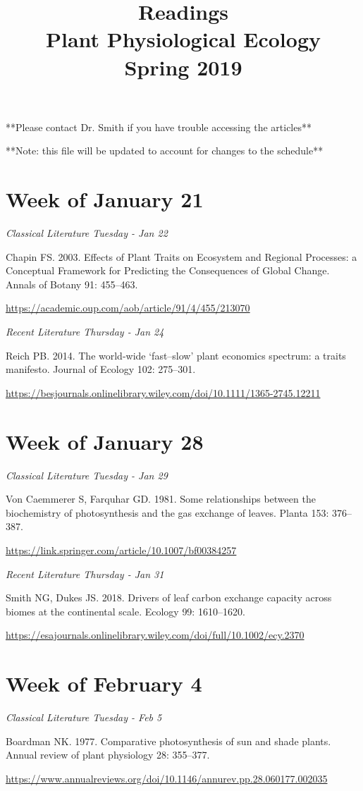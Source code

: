 \documentclass[12pt, notitlepage]{article}   	%
\title{
	\textbf{
		Readings
	} \\
	\large Plant Physiological Ecology \\
	\large Spring 2019
}
\date{\vspace{-5ex}}
\begin{document}
{\selectfont %

\maketitle

**Please contact Dr. Smith if you have trouble accessing the articles**

**Note: this file will be updated to account for changes to the schedule**

\section*{Week of January 21}
\textit{Classical Literature Tuesday - Jan 22} \par
Chapin FS. 2003. Effects of Plant Traits on Ecosystem and Regional Processes: 
a Conceptual Framework for Predicting the Consequences of Global Change. 
Annals of Botany 91: 455–463. \par
\url{https://academic.oup.com/aob/article/91/4/455/213070}

\textit{Recent Literature Thursday - Jan 24} \par
Reich PB. 2014. The world-wide ‘fast–slow’ plant economics spectrum: a traits manifesto. 
Journal of Ecology 102: 275–301. \par
\url{https://besjournals.onlinelibrary.wiley.com/doi/10.1111/1365-2745.12211}

\section*{Week of January 28}
\textit{Classical Literature Tuesday - Jan 29} \par
Von Caemmerer S, Farquhar GD. 1981. Some relationships between the biochemistry of 
photosynthesis and the gas exchange of leaves. Planta 153: 376–387. \par
\url{https://link.springer.com/article/10.1007/bf00384257}

\textit{Recent Literature Thursday - Jan 31} \par
Smith NG, Dukes JS. 2018. Drivers of leaf carbon exchange capacity across biomes at 
the continental scale. Ecology 99: 1610–1620. \par
\url{https://esajournals.onlinelibrary.wiley.com/doi/full/10.1002/ecy.2370}

\section*{Week of February 4}
\textit{Classical Literature Tuesday - Feb 5} \par
Boardman NK. 1977. Comparative photosynthesis of sun and shade plants. 
Annual review of plant physiology 28: 355–377. \par
\url{https://www.annualreviews.org/doi/10.1146/annurev.pp.28.060177.002035}

}
\end{document}
